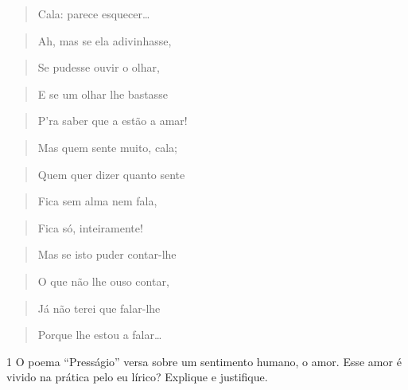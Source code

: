 \begin{quote}
Cala: parece esquecer\ldots{}
\end{quote}

\begin{quote}
Ah, mas se ela adivinhasse,
\end{quote}

\begin{quote}
Se pudesse ouvir o olhar,
\end{quote}

\begin{quote}
E se um olhar lhe bastasse
\end{quote}

\begin{quote}
P'ra saber que a estão a amar!
\end{quote}

\begin{quote}
Mas quem sente muito, cala;
\end{quote}

\begin{quote}
Quem quer dizer quanto sente
\end{quote}

\begin{quote}
Fica sem alma nem fala,
\end{quote}

\begin{quote}
Fica só, inteiramente!
\end{quote}

\begin{quote}
Mas se isto puder contar-lhe
\end{quote}

\begin{quote}
O que não lhe ouso contar,
\end{quote}

\begin{quote}
Já não terei que falar-lhe
\end{quote}

\begin{quote}
Porque lhe estou a falar\ldots{}
\end{quote}


\num{1} O poema ``Presságio'' versa sobre um sentimento humano, o amor.
Esse amor é vivido na prática pelo eu lírico? Explique e justifique.

